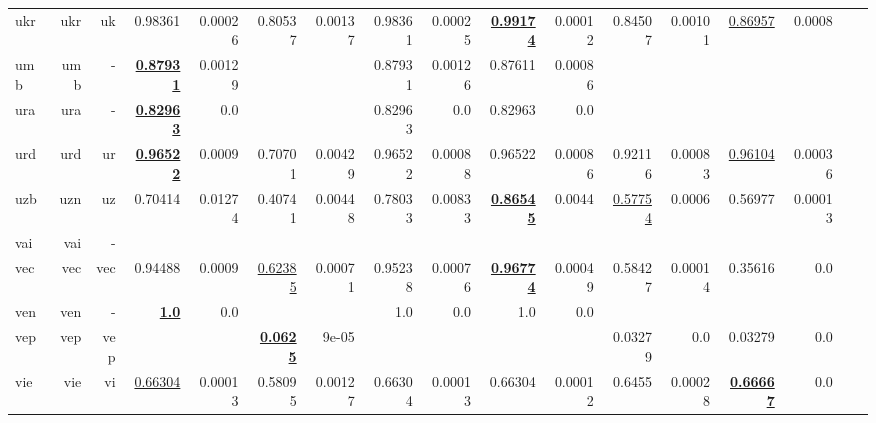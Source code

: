 \documentclass[11pt]{article}
\begin{document}
\begin{table*}[h]
{\begin{tabular}{lrrrrrrrrrrrrrrrr}
ukr         & ukr         & uk         & 0.98361         & 0.00026         & 0.80537         & 0.00137         & 0.98361         & 0.00025         & \textbf{\underline{0.99174}}         & 0.00012         & 0.84507         & 0.00101         & \underline{0.86957}         & 0.0008         \\
umb         & umb         & -         & \textbf{\underline{0.87931}}         & 0.00129         &          &          & 0.87931         & 0.00126         & 0.87611         & 0.00086         &          &          &          &          \\
ura         & ura         & -         & \textbf{\underline{0.82963}}         & 0.0         &          &          & 0.82963         & 0.0         & 0.82963         & 0.0         &          &          &          &          \\
urd         & urd         & ur         & \textbf{\underline{0.96522}}         & 0.0009         & 0.70701         & 0.00429         & 0.96522         & 0.00088         & 0.96522         & 0.00086         & 0.92116         & 0.00083         & \underline{0.96104}         & 0.00036         \\
uzb         & uzn         & uz         & 0.70414         & 0.01274         & 0.40741         & 0.00448         & 0.78033         & 0.00833         & \textbf{\underline{0.86545}}         & 0.0044         & \underline{0.57754}         & 0.0006         & 0.56977         & 0.00013         \\
vai         & vai         & -         &          &          &          &          &          &          &          &          &          &          &          &          \\
vec         & vec         & vec         & 0.94488         & 0.0009         & \underline{0.62385}         & 0.00071         & 0.95238         & 0.00076         & \textbf{\underline{0.96774}}         & 0.00049         & 0.58427         & 0.00014         & 0.35616         & 0.0         \\
ven         & ven         & -         & \textbf{\underline{1.0}}         & 0.0         &          &          & 1.0         & 0.0         & 1.0         & 0.0         &          &          &          &          \\
vep         & vep         & vep         &          &          & \textbf{\underline{0.0625}}         & 9e-05         &          &          &          &          & 0.03279         & 0.0         & 0.03279         & 0.0         \\
vie         & vie         & vi         & \underline{0.66304}         & 0.00013         & 0.58095         & 0.00127         & 0.66304         & 0.00013         & 0.66304         & 0.00012         & 0.6455         & 0.00028         & \textbf{\underline{0.66667}}         & 0.0         \\

\end{tabular}}
\end{table*}
\end{document}

